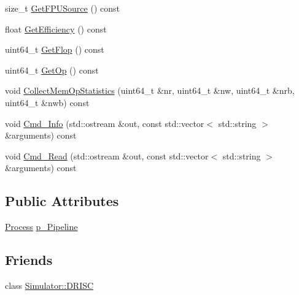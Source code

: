 \begin{DoxyCompactItemize}
\item 
size\+\_\+t \hyperlink{class_simulator_1_1drisc_1_1_pipeline_a3660d8be36349968761a766d9b027cc3}{Get\+F\+P\+U\+Source} () const 
\item 
float \hyperlink{class_simulator_1_1drisc_1_1_pipeline_a80e9f42ed14efdba58e03d49e875eafb}{Get\+Efficiency} () const 
\item 
uint64\+\_\+t \hyperlink{class_simulator_1_1drisc_1_1_pipeline_a839844dca9aa93ba88b77b928d20c69b}{Get\+Flop} () const 
\item 
uint64\+\_\+t \hyperlink{class_simulator_1_1drisc_1_1_pipeline_ac44d38986e5b968980fb549edca8fdee}{Get\+Op} () const 
\item 
void \hyperlink{class_simulator_1_1drisc_1_1_pipeline_ae3aafb7a00022b7591cec9c72fad7994}{Collect\+Mem\+Op\+Statistics} (uint64\+\_\+t \&nr, uint64\+\_\+t \&nw, uint64\+\_\+t \&nrb, uint64\+\_\+t \&nwb) const 
\item 
void \hyperlink{class_simulator_1_1drisc_1_1_pipeline_af347f4ab392dea1ab099aae04f3c9d3c}{Cmd\+\_\+\+Info} (std\+::ostream \&out, const std\+::vector$<$ std\+::string $>$ \&arguments) const 
\item 
void \hyperlink{class_simulator_1_1drisc_1_1_pipeline_a153fbb2d9ff31a3a0fbcbe3176a77f99}{Cmd\+\_\+\+Read} (std\+::ostream \&out, const std\+::vector$<$ std\+::string $>$ \&arguments) const 
\end{DoxyCompactItemize}
\subsection*{Public Attributes}
\begin{DoxyCompactItemize}
\item 
\hyperlink{class_simulator_1_1_process}{Process} \hyperlink{class_simulator_1_1drisc_1_1_pipeline_ae7f3b00d54d8325d4a7354e7348c15f6}{p\+\_\+\+Pipeline}
\end{DoxyCompactItemize}
\subsection*{Friends}
\begin{DoxyCompactItemize}
\item 
class \hyperlink{class_simulator_1_1drisc_1_1_pipeline_a14f94eb83e17d9d8841f39b37431d673}{Simulator\+::\+D\+R\+I\+S\+C}
\end{DoxyCompactItemize}



